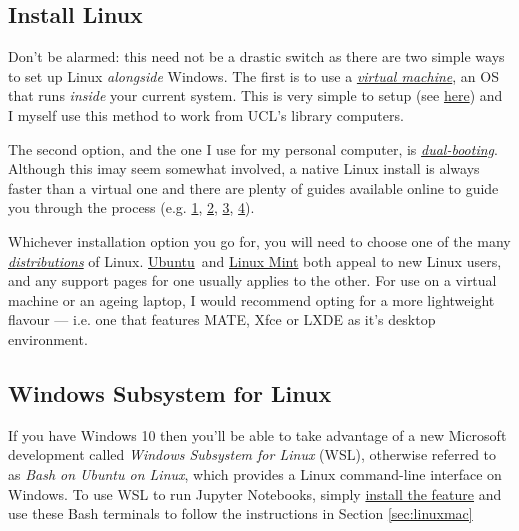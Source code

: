 \documentclass[a4paper]{article}
\begin{document}
\subsection{Install Linux}
\label{sec:win2lnx}
Don't be alarmed: this need not be a drastic switch as there are two simple ways to set up Linux \emph{alongside} Windows.
The first is to use a \emph{\href{https://www.howtogeek.com/196060/beginner-geek-how-to-create-and-use-virtual-machines/}{virtual machine}}, an OS that runs \emph{inside} your current system.
This is very simple to setup (see \href{http://www.storagecraft.com/blog/the-dead-simple-guide-to-installing-a-linux-virtual-machine-on-windows/}{here}) and I myself use this method to work from UCL's library computers.

The second option, and the one I use for my personal computer, is \emph{\href{https://www.howtogeek.com/187789/dual-booting-explained-how-you-can-have-multiple-operating-systems-on-your-computer/}{dual-booting}}.
Although this imay seem somewhat involved, a native Linux install is always faster than a virtual one and there are plenty of guides available online to guide you through the process (e.g. \href{https://itsfoss.com/guide-install-linux-mint-16-dual-boot-windows/}{1}, \href{https://www.lifewire.com/ultimate-windows-7-ubuntu-linux-dual-boot-guide-2200.53}{2}, \href{https://www.howtogeek.com/214571/how-to-dual-boot-linux-on-your-pc/}{3}, \href{http://www.pcworld.com/article/2955460/operating-systems/dual-booting-linux-with-windows-what-you-need-to-know.html}{4}). 

Whichever installation option you go for, you will need to choose one of the many \emph{\href{http://distrowatch.com/dwres.php?resource=major}{distributions}} of Linux. \href{https://www.ubuntu.com/download}{Ubuntu}~and \href{https://linuxmint.com/}{Linux Mint} both appeal to new Linux users, and any support pages for one usually applies to the other.
For use on a virtual machine or an ageing laptop, I would recommend opting for a more lightweight flavour --- i.e. one that features MATE, Xfce or LXDE as it's desktop environment.

\subsection{Windows Subsystem for Linux}
\label{sec:wsl}
If you have Windows 10 then you'll be able to take advantage of a new Microsoft development called \emph{Windows Subsystem for Linux} (WSL), otherwise referred to as \emph{Bash on Ubuntu on Linux}, which provides a Linux command-line interface on Windows.
To use WSL to run Jupyter Notebooks, simply \href{https://msdn.microsoft.com/en-gb/commandline/wsl/install_guide}{install the feature} and use these Bash terminals to follow the instructions in Section \ref{sec:linuxmac}
\end{document}
